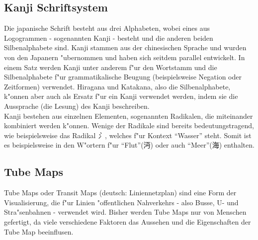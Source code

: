 \subsection{Kanji Schriftsystem}
Die japanische Schrift besteht aus drei Alphabeten, wobei eines aus Logogrammen - sogenannten Kanji - besteht und die anderen beiden Silbenalphabete sind. Kanji stammen aus der chinesischen Sprache und wurden von den Japanern "ubernommen und haben sich seitdem parallel entwickelt. In einem Satz werden Kanji unter anderem f"ur den Wortstamm und die Silbenalphabete f"ur grammatikalische Beugung (beispielsweise Negation oder Zeitformen) verwendet. Hiragana und Katakana, also die Silbenalphabete, k"onnen aber auch als Ersatz f"ur ein Kanji verwendet werden, indem sie die Aussprache (die Lesung) des Kanji beschreiben. \\
Kanji bestehen aus einzelnen Elementen, sogenannten Radikalen, die miteinander kombiniert werden k"onnen. Wenige der Radikale sind bereits bedeutungstragend, wie beispielsweise das Radikal \emph{氵}, welches f"ur Kontext "`Wasser"' steht. Somit ist es beispielsweise in den W"ortern f"ur "`Flut"'(沔) oder auch "`Meer"'(海) enthalten. 

\subsection{Tube Maps}
Tube Maps oder Transit Maps (deutsch: Liniennetzplan) sind eine Form der Visualisierung, die f"ur Linien "offentlichen Nahverkehrs - also Busse, U- und Stra"senbahnen - verwendet wird. Bisher werden Tube Maps nur von Menschen gefertigt, da viele verschiedene Faktoren das Aussehen und die Eigenschaften der Tube Map beeinflusen.  

